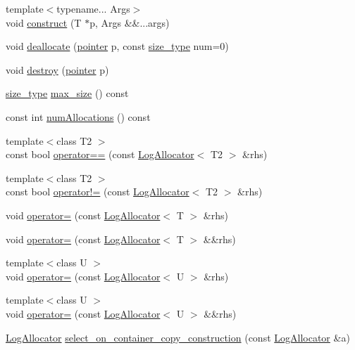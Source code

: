 \begin{DoxyCompactItemize}
\item 
{\footnotesize template$<$typename... Args$>$ }\\void \hyperlink{classprism_1_1_log_allocator_a2f924d050e45903f29aa054950689e85}{construct} (T $\ast$p, Args \&\&...args)
\item 
void \hyperlink{classprism_1_1_log_allocator_a4cb9f95766f22a3e7e2b3b3e8bd2e2bb}{deallocate} (\hyperlink{classprism_1_1_log_allocator_aa95e52dd075368ba542af3da925e6c16}{pointer} p, const \hyperlink{classprism_1_1_log_allocator_a23a86945109072959b47b6becda9925f}{size\+\_\+type} num=0)
\item 
void \hyperlink{classprism_1_1_log_allocator_af6ca74ac2b106ea5bdd734bc45d2d850}{destroy} (\hyperlink{classprism_1_1_log_allocator_aa95e52dd075368ba542af3da925e6c16}{pointer} p)
\item 
\hyperlink{classprism_1_1_log_allocator_a23a86945109072959b47b6becda9925f}{size\+\_\+type} \hyperlink{classprism_1_1_log_allocator_a4cc5f21a926cfda070093c0d6e20ea8d}{max\+\_\+size} () const 
\item 
const int \hyperlink{classprism_1_1_log_allocator_a6b9926b949d74a7727d14d90867aaf52}{num\+Allocations} () const 
\item 
{\footnotesize template$<$class T2 $>$ }\\const bool \hyperlink{classprism_1_1_log_allocator_af60f5819f1bda21883584052c0b5f477}{operator==} (const \hyperlink{classprism_1_1_log_allocator}{Log\+Allocator}$<$ T2 $>$ \&rhs)
\item 
{\footnotesize template$<$class T2 $>$ }\\const bool \hyperlink{classprism_1_1_log_allocator_a4b471163ceb89f4cb59883388f90f4d4}{operator!=} (const \hyperlink{classprism_1_1_log_allocator}{Log\+Allocator}$<$ T2 $>$ \&rhs)
\item 
void \hyperlink{classprism_1_1_log_allocator_af19280444b60a48b79294a59ef60af2e}{operator=} (const \hyperlink{classprism_1_1_log_allocator}{Log\+Allocator}$<$ T $>$ \&rhs)
\item 
void \hyperlink{classprism_1_1_log_allocator_a28c29a4b4f172146ed46c67a2495f49e}{operator=} (const \hyperlink{classprism_1_1_log_allocator}{Log\+Allocator}$<$ T $>$ \&\&rhs)
\item 
{\footnotesize template$<$class U $>$ }\\void \hyperlink{classprism_1_1_log_allocator_a4f42e7e69f644b5dea4ce5010daff408}{operator=} (const \hyperlink{classprism_1_1_log_allocator}{Log\+Allocator}$<$ U $>$ \&rhs)
\item 
{\footnotesize template$<$class U $>$ }\\void \hyperlink{classprism_1_1_log_allocator_a0a1a57828d82319916c8cfcc1c1812fa}{operator=} (const \hyperlink{classprism_1_1_log_allocator}{Log\+Allocator}$<$ U $>$ \&\&rhs)
\item 
\hyperlink{classprism_1_1_log_allocator}{Log\+Allocator} \hyperlink{classprism_1_1_log_allocator_ab6ed315995efe9fbc71c84e490f69f4d}{select\+\_\+on\+\_\+container\+\_\+copy\+\_\+construction} (const \hyperlink{classprism_1_1_log_allocator}{Log\+Allocator} \&a)
\end{DoxyCompactItemize}
